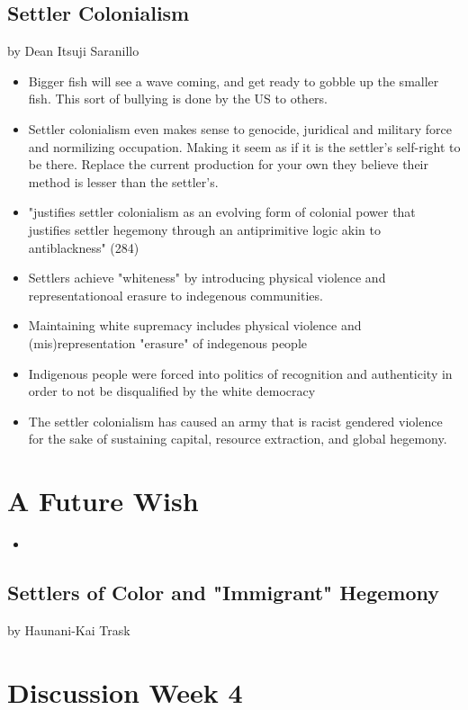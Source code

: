 \documentclass{article}
\begin{document}
\subsection{Settler Colonialism}
by Dean Itsuji Saranillo

\begin{itemize}
  \item Bigger fish will see a wave coming, and get ready to gobble up the
    smaller fish. This sort of bullying is done by the US to others.
  \item Settler colonialism even makes sense to genocide,
    juridical and military force and normilizing occupation. Making it seem
    as if it is the settler's self-right to be there.
    Replace the current production for your own they believe
    their method is lesser than the settler's.
  \item "justifies settler colonialism as an evolving form
    of colonial power that justifies settler hegemony through an
    antiprimitive logic akin to antiblackness" (284)
  \item Settlers achieve "whiteness" by introducing physical violence
    and representationoal erasure to indegenous communities.
  \item Maintaining white supremacy includes
    physical violence and (mis)representation "erasure" of indegenous people
    \item Indigenous people were forced into politics of recognition and authenticity
      in order to not be disqualified by the white democracy
    \item The settler colonialism has caused an army that is racist gendered violence
      for the sake of sustaining capital, resource extraction, and global hegemony.

\end{itemize}

\section*{A Future Wish}
\begin{itemize}
  \item 
\end{itemize}

\subsection{Settlers of Color and "Immigrant" Hegemony}
by Haunani-Kai Trask

\section{Discussion Week 4}
\end{document}
